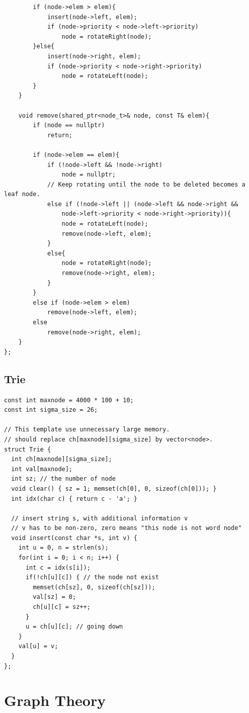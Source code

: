 \documentclass[10pt,landscape]{article}
\begin{document}
\begin{multicols}{2}
\begin{lstlisting}
        if (node->elem > elem){
            insert(node->left, elem);
            if (node->priority < node->left->priority)
                node = rotateRight(node);
        }else{
            insert(node->right, elem);
            if (node->priority < node->right->priority)
                node = rotateLeft(node);
        }
    }

    void remove(shared_ptr<node_t>& node, const T& elem){
        if (node == nullptr)
            return;
        
        if (node->elem == elem){
            if (!node->left && !node->right)
                node = nullptr;
            // Keep rotating until the node to be deleted becomes a leaf node.
            else if (!node->left || (node->left && node->right && 
                node->left->priority < node->right->priority)){
                node = rotateLeft(node);
                remove(node->left, elem);
            }
            else{
                node = rotateRight(node);
                remove(node->right, elem);
            }
        }
        else if (node->elem > elem)
            remove(node->left, elem);
        else
            remove(node->right, elem);
    }
};
\end{lstlisting}

\subsection{Trie}
\begin{lstlisting}
const int maxnode = 4000 * 100 + 10;
const int sigma_size = 26;

// This template use unnecessary large memory.
// should replace ch[maxnode][sigma_size] by vector<node>.
struct Trie {
  int ch[maxnode][sigma_size];
  int val[maxnode];
  int sz; // the number of node
  void clear() { sz = 1; memset(ch[0], 0, sizeof(ch[0])); }
  int idx(char c) { return c - 'a'; }

  // insert string s, with additional information v
  // v has to be non-zero, zero means "this node is not word node" 
  void insert(const char *s, int v) {
    int u = 0, n = strlen(s);
    for(int i = 0; i < n; i++) {
      int c = idx(s[i]);
      if(!ch[u][c]) { // the node not exist
        memset(ch[sz], 0, sizeof(ch[sz]));
        val[sz] = 0;
        ch[u][c] = sz++;
      }
      u = ch[u][c]; // going down
    }
    val[u] = v;
  }
};
\end{lstlisting}

\section{Graph Theory}

\end{multicols}
\end{document}
